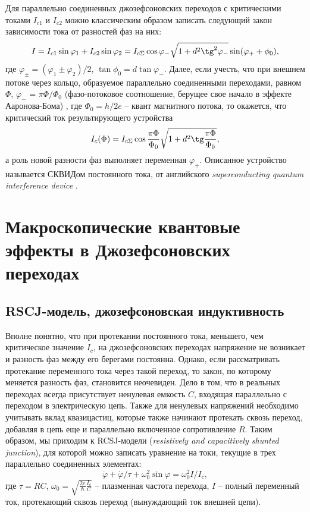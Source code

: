 \documentclass[14pt, a4paper]{extreport}
\numberwithin{equation}{section}
\begin{document}
Для параллельно соединенных джозефсоновских переходов с критическими токами $I_{c1}$ и $I_{c2}$ можно классическим образом записать следующий закон зависимости тока от разностей фаз на них:
\begin{equation}
	I = I_{c1}\sin \varphi_1 + I_{c2}\sin \varphi_2 = I_{c\Sigma} \cos \varphi_- \sqrt{1+d^2 \tg^2 \varphi_-} \sin (\varphi_+ + \phi_0),
\end{equation}
где $\varphi_{\pm} = (\varphi_1 \pm \varphi_2)/2$, $\tan \phi_0 = d \tan \varphi_-$. Далее, если учесть, что при внешнем потоке через кольцо, образуемое параллельно соединенными переходами, равном $\Phi$, $\varphi_-$ = $\pi \Phi/\Phi_0$ (фазо-потоковое соотношение, берущее свое начало в эффекте Ааронова-Бома) \cite{shmidt}, где $\Phi_0 = h/2e$ -- квант магнитного потока, то окажется, что критический ток результирующего устройства
\begin{equation}
	I_c (\Phi) = I_{c\Sigma} \cos \frac{\pi \Phi}{\Phi_0} \sqrt{1+d^2 \tg \frac{\pi \Phi}{\Phi_0}},
\end{equation}
а роль новой разности фаз выполняет переменная $\varphi_+$. Описанное устройство называется СКВИДом постоянного тока, от английского \textit{superconducting quantum interference device} \cite{jacklevic1964silver, jaklevic1964quantum}.

\section{Макроскопические квантовые эффекты в Джозефсоновских переходах}
\subsection{RSCJ-модель, джозефсоновская индуктивность}

Вполне понятно, что при протекании постоянного тока, меньшего, чем критическое значение $I_c$, на джозефсоновских переходах напряжение не возникает и разность фаз между его берегами постоянна. Однако, если рассматривать протекание переменного тока через такой переход, то закон, по которому меняется разность фаз, становится неочевиден. Дело в том, что в реальных переходах всегда присутствует ненулевая емкость $C$, входящая параллельно с переходом в электрическую цепь. Также для ненулевых напряжений необходимо учитывать вклад квазицастиц, которые также начинают протекать сквозь переход, добавляя в цепь еще и параллельно включенное сопротивление $R$. Таким образом, мы приходим к RCSJ-модели (\textit{resistively and capacitively shunted junction}), для которой можно записать уравнение на токи, текущие в трех параллельно соединенных элементах\cite{stewart1968current}:
\begin{equation}
	\ddot \varphi + \dot \varphi/\tau + \omega_0^2 \sin \varphi = \omega_0^2 I/I_c,\label{eq:rcsj_current}
\end{equation}
где $\tau = RC$, $\omega_0 =\sqrt{\frac{2e}{\hbar}\frac{I_c}{C}}$ -- плазменная частота перехода, $I$ -- полный переменный ток, протекающий сквозь переход (вынуждающий ток внешней цепи). 
\end{document}

